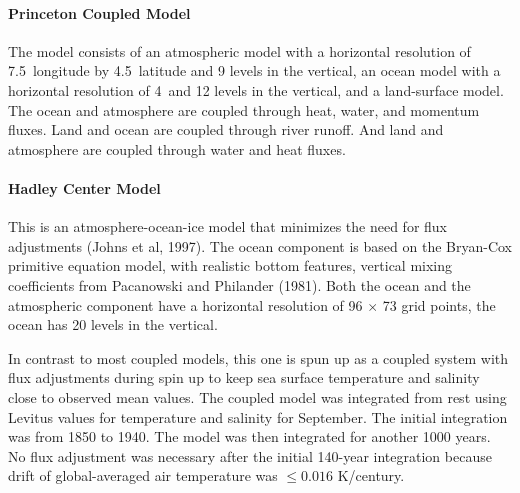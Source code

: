 \paragraph{Princeton Coupled Model} The model consists of an atmospheric model with
a
horizontal resolution of 7.5\degrees\ longitude by
4.5\degrees\ latitude and 9 levels in the vertical, an ocean model
with a horizontal resolution of 4\degrees\ and 12 levels in the
vertical, and a land-surface model. The ocean and atmosphere are
coupled through heat, water, and momentum fluxes. Land and ocean are
coupled through river runoff.  And land and atmosphere are coupled
through water and heat fluxes.

\paragraph{Hadley Center Model} This is an atmosphere-ocean-ice model that minimizes the need for flux
adjustments (Johns
et al, 1997). The ocean component is based on the Bryan-Cox primitive
equation model, with realistic bottom features, vertical mixing
coefficients from Pacanowski and Philander (1981). Both the
ocean and the atmospheric component have a horizontal resolution of 96
$\times$ 73 grid points, the ocean has 20 levels in the vertical.

In contrast to most coupled models, this one is spun up as a coupled
system with flux adjustments during spin up to keep sea surface temperature and
salinity close to observed mean values. The coupled model was
integrated from rest using Levitus values for temperature and salinity
for September. The initial integration was from 1850 to 1940. The
model was then integrated for another 1000 years. No flux adjustment
was necessary
after the initial 140-year integration because drift of
global-averaged air temperature was $\le 0.016$ K/century.

